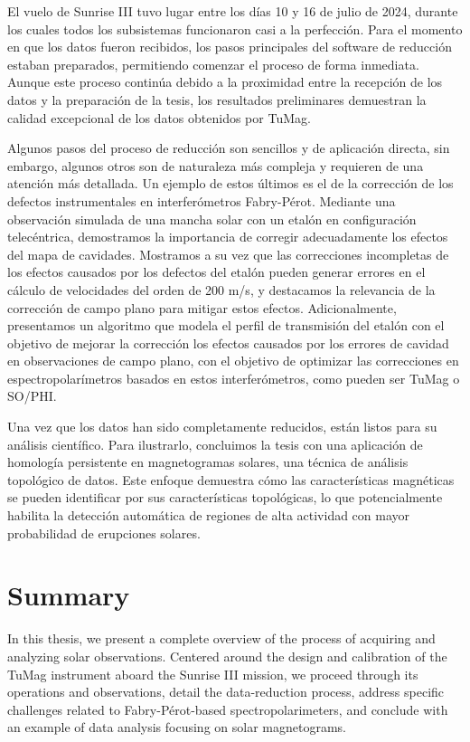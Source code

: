 \documentclass[12pt]{mythesis}
\begin{document}
El vuelo de Sunrise III tuvo lugar entre los días 10 y 16 de julio de 2024, durante los cuales todos los subsistemas funcionaron casi a la perfección. Para el momento en que los datos fueron recibidos, los pasos principales del software de reducción estaban preparados, permitiendo comenzar el proceso de forma inmediata. Aunque este proceso continúa debido a la proximidad entre la recepción de los datos y la preparación de la tesis, los resultados preliminares demuestran la calidad excepcional de los datos obtenidos por TuMag.

Algunos pasos del proceso de reducción son sencillos y de aplicación directa, sin embargo, algunos otros son de naturaleza más compleja y requieren de una atención más detallada. Un ejemplo de estos últimos es el de la corrección de los defectos instrumentales en interferómetros Fabry-Pérot. Mediante una observación simulada de una mancha solar con un etalón en configuración telecéntrica, demostramos la importancia de corregir adecuadamente los efectos del mapa de cavidades. Mostramos a su vez que las correcciones incompletas de los efectos causados por los defectos del etalón pueden generar errores en el cálculo de velocidades del orden de 200 m/s, y destacamos la relevancia de la corrección de campo plano para mitigar estos efectos. Adicionalmente, presentamos un algoritmo que modela el perfil de transmisión del etalón con el objetivo de mejorar la corrección los efectos causados por los errores de cavidad en observaciones de campo plano, con el objetivo de optimizar las correcciones en espectropolarímetros basados en estos interferómetros, como pueden ser TuMag o SO/PHI.

Una vez que los datos han sido completamente reducidos, están listos para su análisis científico. Para ilustrarlo, concluimos la tesis con una aplicación de homología persistente en magnetogramas solares, una técnica de análisis topológico de datos. Este enfoque demuestra cómo las características magnéticas se pueden identificar por sus características topológicas, lo que potencialmente habilita la detección automática de regiones de alta actividad con mayor probabilidad de erupciones solares.                   


\chapter*{Summary}

In this thesis, we present a complete overview of the process of acquiring and analyzing solar observations. Centered around the design and calibration of the TuMag instrument aboard the Sunrise III mission, we proceed through its operations and observations, detail the data-reduction process, address specific challenges related to Fabry-Pérot-based spectropolarimeters, and conclude with an example of data analysis focusing on solar magnetograms.
\end{document}
